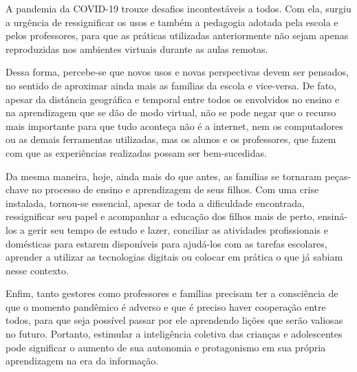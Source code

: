 \documentclass{textolivre}
\begin{document}
A pandemia da COVID-19 trouxe desafios incontestáveis a todos. Com ela, surgiu a urgência de ressignificar os usos e também a pedagogia adotada pela escola e pelos professores, para que as práticas utilizadas anteriormente não sejam apenas reproduzidas nos ambientes virtuais durante as aulas remotas. 
	
Dessa forma, percebe-se que novos usos e novas perspectivas devem ser pensados, no sentido de aproximar ainda mais as famílias da escola e vice-versa. De fato, apesar da distância geográfica e temporal entre todos os envolvidos no ensino e na aprendizagem que se dão de modo virtual, não se pode negar que o recurso mais importante para que tudo aconteça não é a internet, nem os computadores ou as demais ferramentas utilizadas, mas os alunos e os professores, que fazem com que as experiências realizadas possam ser bem-sucedidas. 

Da mesma maneira, hoje, ainda mais do que antes, as famílias se tornaram peças-chave no processo de ensino e aprendizagem de seus filhos. Com uma crise instalada, tornou-se essencial, apesar de toda a dificuldade encontrada, ressignificar seu papel e acompanhar a educação dos filhos mais de perto, ensiná-los a gerir seu tempo de estudo e lazer, conciliar as atividades profissionais e domésticas para estarem disponíveis para ajudá-los com as tarefas escolares, aprender a utilizar as tecnologias digitais ou colocar em prática o que já sabiam nesse contexto. 

Enfim, tanto gestores como professores e famílias precisam ter a consciência de que o momento pandêmico é adverso e que é preciso haver cooperação entre todos, para que seja possível passar por ele aprendendo lições que serão valiosas no futuro. Portanto, estimular a inteligência coletiva das crianças e adolescentes pode significar o aumento de sua autonomia e protagonismo em sua própria aprendizagem na era da informação.

\printbibliography\label{sec-bib}
\end{document}
